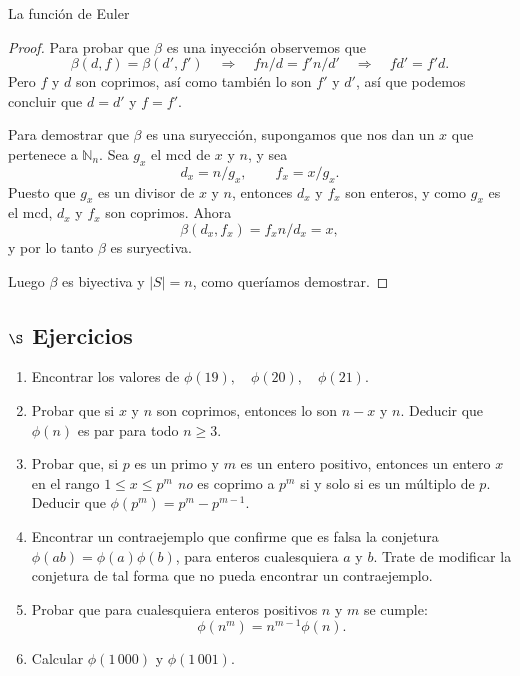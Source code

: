\begin{section}{La función de Euler}
\begin{proof}
Para probar que $\beta$ es una inyección observemos que
$$
\beta(d,f) = \beta(d',f') \quad \Rightarrow \quad fn/d = f'n/d'
\quad \Rightarrow \quad fd'=f'd.
$$
Pero $f$ y $d$ son coprimos, así como también lo son $f'$ y $d'$,
así que podemos concluir que $d=d'$ y $f=f'$.

Para demostrar que $\beta$ es una suryección, supongamos que nos
dan un $x$ que pertenece a $\mathbb N_n$. Sea $g_x$ el mcd de $x$
y $n$, y sea
$$
d_x = n/g_x, \qquad f_x = x /g_x.
$$
Puesto que $g_x$ es un divisor de $x$ y $n$, entonces $d_x$ y
$f_x$ son enteros, y como $g_x$ es el mcd, $d_x$ y $f_x$ son
coprimos. Ahora
$$
\beta(d_x,f_x) = f_x n/d_x = x,
$$
y por lo tanto $\beta$ es suryectiva.

Luego $\beta$ es biyectiva y $|S|=n$, como queríamos demostrar.
\end{proof}

\subsection*{\Large $\S$ Ejercicios}
\begin{enumerate}[1)]
\item Encontrar los valores de $\phi(19),\quad \phi(20),\quad \phi(21)$.

\item Probar que si $x$ y $n$ son coprimos, entonces lo son $n-x$ y
$n$. Deducir que $\phi(n)$ es par para todo $n \ge 3$.

\item Probar que, si $p$ es un primo y $m$ es un entero positivo,
entonces un entero $x$ en el rango $1 \le x \le p^m$ {\it no} es
coprimo a $p^m$ si y solo si es un múltiplo de $p$. Deducir que
$\phi(p^m) = p^m - p^{m-1}$.

\item Encontrar un contraejemplo que confirme que es falsa la conjetura
$\phi(ab)= \phi(a)\phi(b)$, para enteros cualesquiera $a$ y $b$.
Trate de modificar la conjetura de tal forma que no pueda
encontrar un contraejemplo.

\item Probar que para cualesquiera enteros positivos $n$ y $m$ se cumple:
$$
\phi(n^m) =n^{m-1}\phi(n).
$$

\item Calcular $\phi(1\,000)$ y $\phi(1\,001)$.
\end{enumerate}


\end{section}



